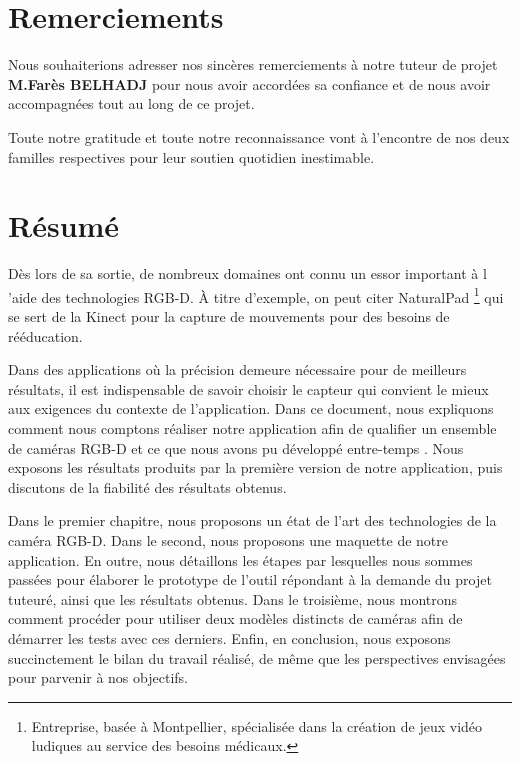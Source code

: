\documentclass[a4paper, 12pt]{book}
\newcounter{program}[subsection]
\begin{document}
\chapter*{Remerciements}
\par Nous souhaiterions adresser nos sincères remerciements à notre tuteur de projet \textbf{M.Farès BELHADJ} pour nous avoir accordées sa confiance et de nous avoir accompagnées tout au long de ce projet. \\
\par Toute notre gratitude et toute notre reconnaissance vont à l'encontre de nos deux familles respectives pour leur soutien quotidien inestimable.

\chapter*{Résumé}
Dès lors de sa sortie, de nombreux domaines ont connu un essor important à l 'aide des technologies RGB-D. À titre d'exemple, on peut citer NaturalPad \footnote{Entreprise, basée à Montpellier, spécialisée dans la création de jeux vidéo ludiques au service des besoins médicaux.} qui se sert de la Kinect pour la capture de mouvements pour des besoins de rééducation.	
\par Dans des applications où la précision demeure nécessaire pour de meilleurs résultats, il est indispensable de savoir choisir le capteur qui convient le mieux aux exigences du contexte de l'application.
Dans ce document, nous expliquons comment nous comptons réaliser notre application afin de qualifier un ensemble de caméras RGB-D et ce que nous avons pu développé entre-temps . Nous exposons les résultats produits par la première version de notre application, puis discutons de la fiabilité des résultats obtenus.
\par Dans le premier chapitre, nous proposons un état de l'art des technologies de la caméra RGB-D. Dans le second, nous proposons une maquette de notre application. En outre, nous détaillons les étapes par lesquelles nous sommes passées pour élaborer le prototype de l'outil répondant à la demande du projet tuteuré, ainsi que les résultats obtenus. Dans le troisième, nous montrons comment procéder pour utiliser deux modèles distincts de caméras afin de démarrer les tests avec ces derniers. Enfin, en conclusion, nous exposons succinctement le bilan du travail réalisé, de même que les perspectives envisagées pour parvenir à nos objectifs.

\tableofcontents
\listoffigures
\mainmatter
\end{document}
